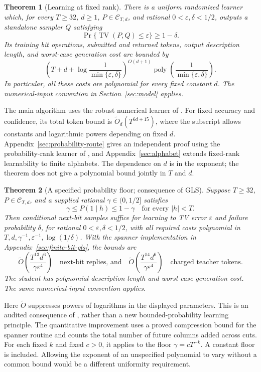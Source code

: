 \documentclass[11pt]{article}
\newcommand{\TV}{\operatorname{TV}}
\newcommand{\poly}{\operatorname{poly}}
\newtheorem{theorem}{Theorem}
\theoremstyle{definition}
\theoremstyle{remark}
\begin{document}
\begin{theorem}[Learning at fixed rank]\label{thm:fixed}
There is a uniform randomized learner which, for every $T\ge32$, $d\ge1$, $P\in\mathcal C_{T,d}$, and rational $0<\varepsilon,\delta<1/2$, outputs a standalone sampler $Q$ satisfying
\[
\Pr\{\TV(P,Q)\le\varepsilon\}\ge1-\delta.
\]
Its training bit operations, submitted and returned tokens, output description length, and worst-case generation cost are bounded by
\[
\left(T+d+\log\frac1{\min\{\varepsilon,\delta\}}\right)^{O(d+1)}
\poly\!\left(\frac1{\min\{\varepsilon,\delta\}}\right).
\]
In particular, all these costs are polynomial for every fixed constant $d$.
The numerical-input convention in Section~\ref{sec:model} applies.
\end{theorem}

The main algorithm uses the robust numerical learner of \citet{gls2}. For fixed accuracy and confidence, its total token bound is $\widetilde O_d(T^{6d+15})$, where the subscript allows constants and logarithmic powers depending on fixed $d$. Appendix~\ref{sec:probability-route} gives an independent proof using the probability-rank learner of \citet{liu-moitra}, and Appendix~\ref{sec:alphabet} extends fixed-rank learnability to finite alphabets. The dependence on $d$ is in the exponent; the theorem does not give a polynomial bound jointly in $T$ and $d$.

\begin{theorem}[A specified probability floor; consequence of GLS]\label{thm:floor}
Suppose $T\ge32$, $P\in\mathcal C_{T,d}$, and a supplied rational $\gamma\in(0,1/2]$ satisfies
\[
\gamma\le P(1\mid h)\le1-\gamma
\quad\text{for every }|h|<T.
\]
Then conditional next-bit samples suffice for learning to TV error $\varepsilon$ and failure probability $\delta$, for rational $0<\varepsilon,\delta<1/2$, with all required costs polynomial in $T,d,\gamma^{-1},\varepsilon^{-1},\log(1/\delta)$. With the spanner implementation in Appendix~\ref{sec:finite-bit-gls}, the bounds are
\[
\widetilde O\!\left(\frac{T^{13}d^6}{\gamma\varepsilon^4}\right)
\quad\text{next-bit replies, and}\quad
\widetilde O\!\left(\frac{T^{14}d^6}{\gamma\varepsilon^4}\right)
\quad\text{charged teacher tokens}.
\]
The student has polynomial description length and worst-case generation cost.
The same numerical-input convention applies.
\end{theorem}

Here $\widetilde O$ suppresses powers of logarithms in the displayed parameters. This is an audited consequence of \citet[Theorem~5.11 and Remark~5.8]{gls2}, rather than a new bounded-probability learning principle. The quantitative improvement uses a proved compression bound for the spanner routine and counts the total number of future columns added across cuts. For each fixed $k$ and fixed $c>0$, it applies to the floor $\gamma=cT^{-k}$. A constant floor is included. Allowing the exponent of an unspecified polynomial to vary without a common bound would be a different uniformity requirement.
\end{document}
